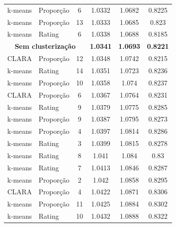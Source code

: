 \documentclass[12pt,a4paper,header]{abnt}
\begin{document}
\begin{longtable}{@{}llcccc@{}}
k-means   & Proporção              & 6          & 1.0332          & 1.0682          & 0.8225          \\
k-means   & Proporção              & 13         & 1.0333          & 1.0685          & 0.823           \\
k-means   & Rating                 & 6          & 1.0338          & 1.0688          & 0.8185          \\
\multicolumn{3}{c}{\textbf{Sem clusterização}} & \textbf{1.0341} & \textbf{1.0693} & \textbf{0.8221} \\
CLARA    & Proporção              & 12         & 1.0348          & 1.0742          & 0.8215          \\
k-means   & Rating                 & 14         & 1.0351          & 1.0723          & 0.8236          \\
k-means   & Proporção              & 10         & 1.0358          & 1.074           & 0.8237          \\
CLARA    & Proporção              & 6          & 1.0367          & 1.0764          & 0.8231          \\
k-means   & Rating                 & 9          & 1.0379          & 1.0775          & 0.8285          \\
k-means   & Proporção              & 9          & 1.0387          & 1.0795          & 0.8273          \\
k-means   & Proporção              & 4          & 1.0397          & 1.0814          & 0.8286          \\
k-means   & Rating                 & 3          & 1.0399          & 1.0815          & 0.8278          \\
k-means   & Rating                 & 8          & 1.041           & 1.084           & 0.83            \\
k-means   & Rating                 & 7          & 1.0413          & 1.0846          & 0.8287          \\
k-means   & Proporção              & 2          & 1.042           & 1.0858          & 0.8295          \\
CLARA    & Proporção              & 4          & 1.0422          & 1.0871          & 0.8306          \\
k-means   & Proporção              & 11         & 1.0425          & 1.0884          & 0.8302          \\
k-means   & Rating                 & 10         & 1.0432          & 1.0888          & 0.8322          \\

\end{longtable}
\end{document}
